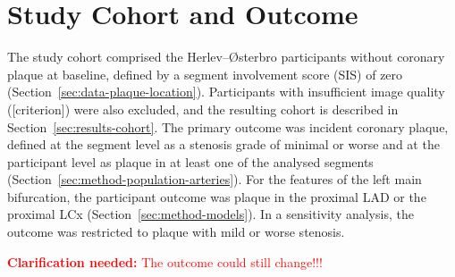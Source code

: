 \providecommand{\clarify}[1]{\textcolor{red}{\textbf{Clarification needed:} #1}}
\section{Study Cohort and Outcome}
\label{sec:method-population}

The study cohort comprised the Herlev--{\O}sterbro participants without coronary plaque at baseline, defined by a segment involvement score (SIS) of zero (Section~\ref{sec:data-plaque-location}).
Participants with insufficient image quality ([criterion]) were also excluded, and the resulting cohort is described in Section~\ref{sec:results-cohort}.
The primary outcome was incident coronary plaque, defined at the segment level as a stenosis grade of minimal or worse and at the participant level as plaque in at least one of the analysed segments (Section~\ref{sec:method-population-arteries}).
For the features of the left main bifurcation, the participant outcome was plaque in the proximal LAD or the proximal LCx (Section~\ref{sec:method-models}).
In a sensitivity analysis, the outcome was restricted to plaque with mild or worse stenosis.

\clarify{The outcome could still change!!!}
